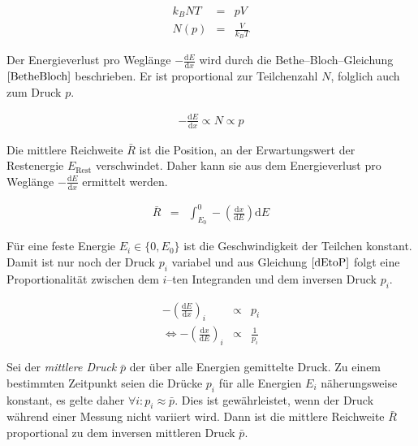 \documentclass[12pt,a4paper]{scrartcl}
\numberwithin{equation}{section} %
\begin{document}
\begin{eqnarray}
    k_B N T &=& pV \label{iGG} \\
    N(p) &=& \frac{V}{k_B T}
\end{eqnarray}

\noindent
Der Energieverlust pro Weglänge $-\frac{\mathrm dE}{\mathrm dx}$ wird durch die Bethe--Bloch--Gleichung $\eqref{BetheBloch}$ beschrieben. Er ist proportional zur Teilchenzahl $N$, folglich auch zum Druck $p$.

\begin{eqnarray}
    -\frac{\mathrm dE}{\mathrm dx}\propto N\propto p \label{dEtoP}
\end{eqnarray}

\noindent
Die mittlere Reichweite $\bar R$ ist die Position, an der Erwartungswert der Restenergie $E_\mathrm{Rest}$ verschwindet. Daher kann sie aus dem Energieverlust pro Weglänge $-\frac{\mathrm dE}{\mathrm dx}$ ermittelt werden.

\begin{eqnarray}
    \bar{R} &=&
        \int_{E_0}^{0} -\left(\frac{\mathrm dx}{\mathrm dE}\right) \mathrm dE
\end{eqnarray}

\noindent
Für eine feste Energie $E_i \in \{0, E_0\}$ ist die Geschwindigkeit der Teilchen konstant. Damit ist nur noch der Druck $p_i$ variabel und aus Gleichung $\eqref{dEtoP}$ folgt eine Proportionalität zwischen dem $i$--ten Integranden und dem inversen Druck $p_i$.

\begin{eqnarray}
    -\left(\frac{\mathrm dE}{\mathrm dx}\right)_i &\propto& p_i \\
    \Leftrightarrow -\left(\frac{\mathrm dx}{\mathrm dE}\right)_i
        &\propto& \frac{1}{p_i}
\end{eqnarray}

\noindent
Sei der \emph{mittlere Druck} $\bar p$ der über alle Energien gemittelte Druck. Zu einem bestimmten Zeitpunkt seien die Drücke $p_i$ für alle Energien $E_i$ näherungsweise konstant, es gelte daher $\forall i: p_i \approx \bar p$. Dies ist gewährleistet, wenn der Druck während einer Messung nicht variiert wird. Dann ist die mittlere Reichweite $\bar R$ proportional zu dem inversen mittleren Druck $\bar p$.
\end{document}
